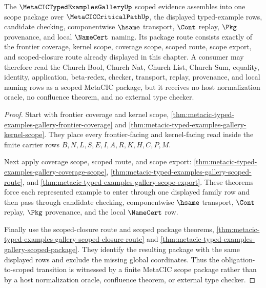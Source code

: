 \begin{theorem}
\label{thm:metacic-typed-examples-gallery-scope-package}
The $\MetaCICTypedExamplesGalleryUp$ scoped evidence assembles into one scope package over $\MetaCICCriticalPathUp$, the displayed typed-example rows, candidate checking, componentwise $\hsame$ transport, $\Cont$ replay, $\Pkg$ provenance, and local $\NameCert$ naming. Its package route consists exactly of the frontier coverage, kernel scope, coverage scope, scoped route, scope export, and scoped-closure route already displayed in this chapter. A consumer may therefore read the Church Bool, Church Nat, Church List, Church Sum, equality, identity, application, beta-redex, checker, transport, replay, provenance, and local naming rows as a scoped MetaCIC package, but it receives no host normalization oracle, no confluence theorem, and no external type checker.
\end{theorem}
\begin{proof}
Start with frontier coverage and kernel scope, \autoref{thm:metacic-typed-examples-gallery-frontier-coverage} and \autoref{thm:metacic-typed-examples-gallery-kernel-scope}. They place every frontier-facing and kernel-facing read inside the finite carrier rows $B,N,L,S,E,I,A,R,K,H,C,P,M$.

Next apply coverage scope, scoped route, and scope export: \autoref{thm:metacic-typed-examples-gallery-coverage-scope}, \autoref{thm:metacic-typed-examples-gallery-scoped-route}, and \autoref{thm:metacic-typed-examples-gallery-scope-export}. These theorems force each represented example to enter through one displayed family row and then pass through candidate checking, componentwise $\hsame$ transport, $\Cont$ replay, $\Pkg$ provenance, and the local $\NameCert$ row.

Finally use the scoped-closure route and scoped package theorems, \autoref{thm:metacic-typed-examples-gallery-scoped-closure-route} and \autoref{thm:metacic-typed-examples-gallery-scoped-package}. They identify the resulting package with the same displayed rows and exclude the missing global coordinates. Thus the obligation-to-scoped transition is witnessed by a finite MetaCIC scope package rather than by a host normalization oracle, confluence theorem, or external type checker.
\end{proof}

